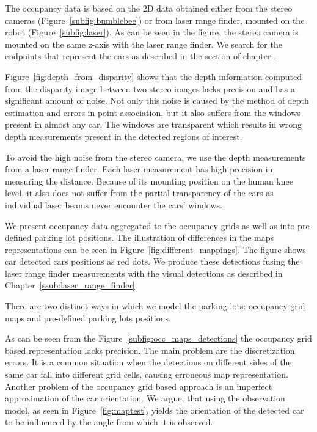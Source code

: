 The occupancy data is based on the 2D data obtained either from the stereo
cameras (Figure~\ref{subfig:bumblebee}) or from laser range finder, mounted on
the robot (Figure~\ref{subfig:laser}). As can be seen in the figure, the
stereo camera is mounted on the same z-axis with the laser range finder. We
search for the endpoints that represent the cars as described in the section
 of chapter .

Figure~\ref{fig:depth_from_disparity} shows that the depth information
computed from the disparity image between two stereo images lacks precision
and has a significant amount of noise. Not only this noise is caused by the
method of depth estimation and errors in point association, but it also
suffers from the windows present in almost any car. The windows are
transparent which results in wrong depth measurements present in the detected
regions of interest.

To avoid the high noise from the stereo camera, we use the depth measurements
from a laser range finder. Each laser measurement has high precision in
measuring the distance. Because of its mounting position on the human knee
level, it also does not suffer from the partial transparency of the cars as
individual laser beams never encounter the cars' windows.

We present occupancy data aggregated to the occupancy grids as well as into
pre-defined parking lot positions. The illustration of differences in the maps
representations can be seen in Figure~\ref{fig:different_mappings}. The figure
shows car detected  cars positions as red dots. We produce these detections
fusing the laser range finder measurements with the visual detections as
described in Chapter~\ref{ssub:laser_range_finder}.

There are two distinct ways in which we model the parking lots: occupancy grid
maps and pre-defined parking lots positions.

As can be seen from the Figure~\ref{subfig:occ_maps_detections} the occupancy
grid based representation lacks precision. The main problem are the
discretization errors. It is a common situation when the detections on
different sides of the same car fall into different grid cells, causing
erroneous map representation. Another problem of the occupancy grid based
approach is an imperfect approximation of the car orientation. We argue, that
using the observation model, as seen in Figure~\ref{fig:maptest}, yields the
orientation of the detected car to be influenced by the angle from which it is
observed.

